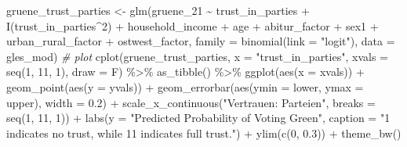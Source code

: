 \documentclass[
]{article}
\newenvironment{Shaded}{\begin{snugshade}}{\end{snugshade}}
\newcommand{\AttributeTok}[1]{\textcolor[rgb]{0.77,0.63,0.00}{#1}}
\newcommand{\CommentTok}[1]{\textcolor[rgb]{0.56,0.35,0.01}{\textit{#1}}}
\newcommand{\DecValTok}[1]{\textcolor[rgb]{0.00,0.00,0.81}{#1}}
\newcommand{\FloatTok}[1]{\textcolor[rgb]{0.00,0.00,0.81}{#1}}
\newcommand{\FunctionTok}[1]{\textcolor[rgb]{0.00,0.00,0.00}{#1}}
\newcommand{\NormalTok}[1]{#1}
\newcommand{\OtherTok}[1]{\textcolor[rgb]{0.56,0.35,0.01}{#1}}
\newcommand{\SpecialCharTok}[1]{\textcolor[rgb]{0.00,0.00,0.00}{#1}}
\newcommand{\StringTok}[1]{\textcolor[rgb]{0.31,0.60,0.02}{#1}}
\begin{document}
\begin{Shaded}
\begin{Highlighting}[]
\NormalTok{gruene\_trust\_parties }\OtherTok{\textless{}{-}} \FunctionTok{glm}\NormalTok{(gruene\_21 }\SpecialCharTok{\textasciitilde{}}\NormalTok{ trust\_in\_parties }\SpecialCharTok{+} \FunctionTok{I}\NormalTok{(trust\_in\_parties}\SpecialCharTok{\^{}}\DecValTok{2}\NormalTok{) }\SpecialCharTok{+}\NormalTok{ household\_income }\SpecialCharTok{+}\NormalTok{ age }\SpecialCharTok{+}\NormalTok{ abitur\_factor }\SpecialCharTok{+}\NormalTok{ sex1 }\SpecialCharTok{+}\NormalTok{ urban\_rural\_factor }\SpecialCharTok{+}\NormalTok{ ostwest\_factor, }\AttributeTok{family =} \FunctionTok{binomial}\NormalTok{(}\AttributeTok{link =} \StringTok{"logit"}\NormalTok{), }\AttributeTok{data =}\NormalTok{ gles\_mod)}
\CommentTok{\# plot}
\FunctionTok{cplot}\NormalTok{(gruene\_trust\_parties, }\AttributeTok{x =} \StringTok{"trust\_in\_parties"}\NormalTok{,}
      \AttributeTok{xvals =} \FunctionTok{seq}\NormalTok{(}\DecValTok{1}\NormalTok{, }\DecValTok{11}\NormalTok{, }\DecValTok{1}\NormalTok{), }\AttributeTok{draw =}\NormalTok{ F) }\SpecialCharTok{\%\textgreater{}\%}
  \FunctionTok{as\_tibble}\NormalTok{() }\SpecialCharTok{\%\textgreater{}\%}
  \FunctionTok{ggplot}\NormalTok{(}\FunctionTok{aes}\NormalTok{(}\AttributeTok{x =}\NormalTok{ xvals)) }\SpecialCharTok{+}
  \FunctionTok{geom\_point}\NormalTok{(}\FunctionTok{aes}\NormalTok{(}\AttributeTok{y =}\NormalTok{ yvals)) }\SpecialCharTok{+}
  \FunctionTok{geom\_errorbar}\NormalTok{(}\FunctionTok{aes}\NormalTok{(}\AttributeTok{ymin =}\NormalTok{ lower, }\AttributeTok{ymax =}\NormalTok{ upper), }\AttributeTok{width =} \FloatTok{0.2}\NormalTok{) }\SpecialCharTok{+}
  \FunctionTok{scale\_x\_continuous}\NormalTok{(}\StringTok{"Vertrauen: Parteien"}\NormalTok{, }
                     \AttributeTok{breaks =} \FunctionTok{seq}\NormalTok{(}\DecValTok{1}\NormalTok{, }\DecValTok{11}\NormalTok{, }\DecValTok{1}\NormalTok{)) }\SpecialCharTok{+}
  \FunctionTok{labs}\NormalTok{(}\AttributeTok{y =} \StringTok{"Predicted Probability of Voting Green"}\NormalTok{, }
       \AttributeTok{caption =} \StringTok{"\textquotesingle{}1\textquotesingle{} indicates \textquotesingle{}no trust\textquotesingle{}, while 11 indicates \textquotesingle{}full trust\textquotesingle{}."}\NormalTok{) }\SpecialCharTok{+}
  \FunctionTok{ylim}\NormalTok{(}\FunctionTok{c}\NormalTok{(}\DecValTok{0}\NormalTok{, }\FloatTok{0.3}\NormalTok{)) }\SpecialCharTok{+}
  \FunctionTok{theme\_bw}\NormalTok{()}
\end{Highlighting}
\end{Shaded}
\end{document}
